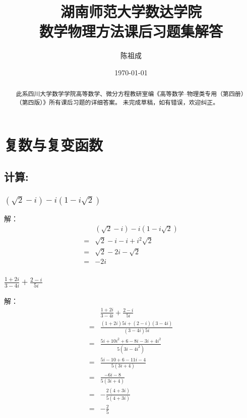 \documentclass[10pt,a4paper,twocolumn]{ctexart}
\numberwithin{equation}{subsection}
\begin{document}
\title{\Large{湖南师范大学数达学院}\\数学物理方法课后习题集解答}

\date{\today}
\author{陈祖成}
\maketitle

\begin{abstract}
	此系四川大学数学学院高等数学、微分方程教研室编《高等数学--物理类专用（第四册）（第四版）》所有课后习题的详细答案。
	未完成草稿，如有错误，欢迎纠正。
\end{abstract}
\tableofcontents
\section{复数与复变函数}	

\subsection{计算:}
\subsubsection{$(\sqrt{2}- i) - i (1 - i\sqrt{2})$}
解：
	\begin{align}
		& (\sqrt{2}-i)-i(1-i \sqrt{2}) \\
		= & \sqrt{2}-i-i + i^2 \sqrt{2} \\
		= & \sqrt{2}-2i-\sqrt{2} \\
		= & -2 i
	\end{align}

\subsubsection{$\frac{1+2 i}{3-4 i}+\frac{2-i}{5 i}$}
解：
\begin{align}
		& \frac{1+2 i}{3-4 i}+\frac{2-i}{5 i} \\
		= & \frac{(1+2 i) 5 i+(2-i)(3-4 i)}{(3-4 i) 5 i} \\
		= & \frac{5 i + 10i^2 +6-8 i-3 i + 4i^2}{5(3 i-4i^2)} \\
		= & \frac{5 i-10+6-11 i-4}{5(3 i+4)} \\
		= & \frac{-6 i-8}{5(3 i+4)} \\
		= & -\frac{2(4+3 i)}{5(4+3 i)} \\
		= & -\frac{2}{5}
	\end{align}
	
\end{document}
